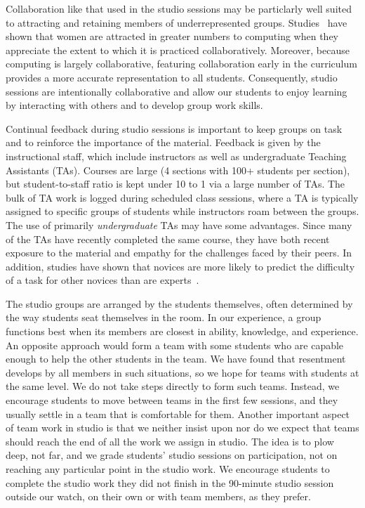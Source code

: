 Collaboration like that used in the studio sessions may be particlarly well suited to attracting and retaining members of underrepresented groups. Studies~\cite{Krause:2012:EFL:2157136.2157192} have shown that women are attracted in greater numbers to computing when they appreciate the extent to which it is practiced collaboratively.  Moreover, because computing is largely collaborative, featuring collaboration early in the curriculum provides a more accurate representation to all students.  Consequently, studio sessions are intentionally collaborative and allow our students to enjoy learning by interacting with others and to develop group work skills.

Continual feedback during studio sessions is important to keep groups on task and to reinforce the importance of the material.  Feedback is given by the instructional staff, which include instructors as well as undergraduate Teaching Assistants (TAs). Courses are large (4 sections with 100+ students per section), but student-to-staff ratio is kept under 10 to 1 via a large number of TAs.  The bulk of TA work is logged during scheduled class sessions, where a TA is typically assigned to specific groups of students while instructors roam between the groups.  The use of primarily \emph{undergraduate} TAs may have some advantages.  Since many of the TAs have recently completed the same course, they have both recent exposure to the material and empathy for the challenges faced by their peers.  In addition, studies have shown that novices are more likely to predict the difficulty of a task for other novices than are experts~\cite{Hinds:1999}.

The studio groups are arranged by the students themselves, often determined by the way students seat themselves in the room. In our experience, a group functions best when its members are closest in ability, knowledge, and experience.  An opposite approach would form a team with some students who are capable enough to help the other students in the team.  We have found that resentment develops by all members in such situations, so we hope for teams with students at the same level.   We do not take steps directly to form such teams.  Instead, we encourage students to move between teams in the first few sessions, and they usually settle in a team that is comfortable for them.  Another important aspect of team work in studio is that we neither insist upon nor do we expect that teams should reach the end of all the work we assign in studio.  The idea is to plow deep, not far, and we grade students' studio sessions on participation, not on reaching any particular point in the studio work.  We encourage students to complete the studio work they did not finish in the 90-minute studio session outside our watch, on their own or with team members, as they prefer.

